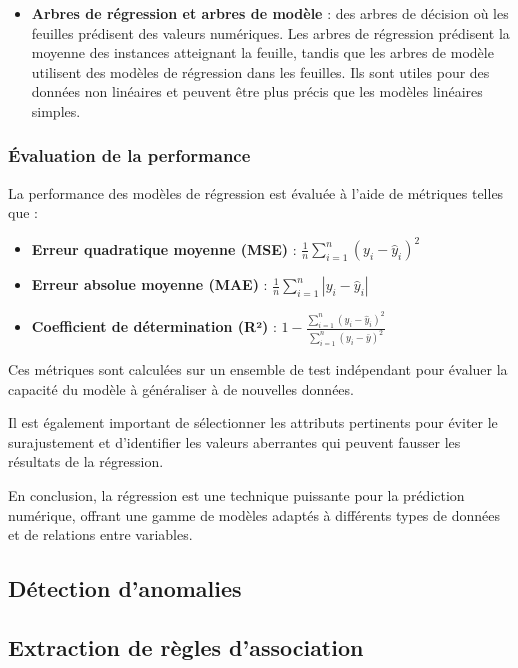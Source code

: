 \documentclass[a4paper,12pt]{report}
\begin{document}
\begin{itemize}
    \item \textbf{Arbres de régression et arbres de modèle} : des arbres de décision où les feuilles prédisent des valeurs numériques. Les arbres de régression prédisent la moyenne des instances atteignant la feuille, tandis que les arbres de modèle utilisent des modèles de régression dans les feuilles. Ils sont utiles pour des données non linéaires et peuvent être plus précis que les modèles linéaires simples.
\end{itemize}

\subsubsection*{Évaluation de la performance}

La performance des modèles de régression est évaluée à l’aide de métriques telles que :

\begin{itemize}
    \item \textbf{Erreur quadratique moyenne (MSE)} : \(\frac{1}{n} \sum_{i=1}^n (y_i - \hat{y}_i)^2\)
    \item \textbf{Erreur absolue moyenne (MAE)} : \(\frac{1}{n} \sum_{i=1}^n |y_i - \hat{y}_i|\)
    \item \textbf{Coefficient de détermination (R²)} : \(1 - \frac{\sum_{i=1}^n (y_i - \hat{y}_i)^2}{\sum_{i=1}^n (y_i - \bar{y})^2}\)
\end{itemize}

Ces métriques sont calculées sur un ensemble de test indépendant pour évaluer la capacité du modèle à généraliser à de nouvelles données.

Il est également important de sélectionner les attributs pertinents pour éviter le surajustement et d’identifier les valeurs aberrantes qui peuvent fausser les résultats de la régression.

En conclusion, la régression est une technique puissante pour la prédiction numérique, offrant une gamme de modèles adaptés à différents types de données et de relations entre variables.  
        \subsection{Détection d’anomalies}

        \subsection{Extraction de règles d’association}
        
\end{document}
